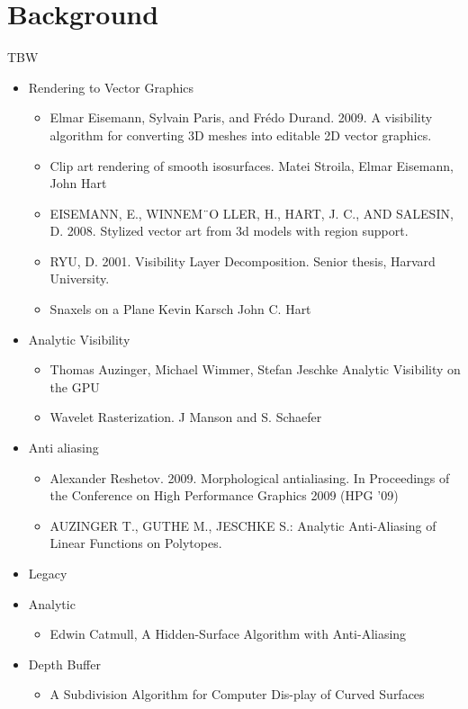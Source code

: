 \documentclass[review]{acmsiggraph}
\begin{document}
\section{Background}
TBW
\begin{itemize}
\item Rendering to Vector Graphics 
\begin{itemize}
\item Elmar Eisemann, Sylvain Paris, and Frédo Durand. 2009. A visibility algorithm for converting 3D meshes into editable 2D vector graphics. 
\item Clip art rendering of smooth isosurfaces. Matei Stroila, Elmar Eisemann, John Hart
\item EISEMANN, E., WINNEM¨O LLER, H., HART, J. C., AND SALESIN, D. 2008. Stylized vector art from 3d models with region support.
\item RYU, D. 2001. Visibility Layer Decomposition. Senior thesis, Harvard University.
\item Snaxels on a Plane Kevin Karsch John C. Hart 
\end{itemize}
\item Analytic Visibility
\begin{itemize}
\item Thomas Auzinger, Michael Wimmer, Stefan Jeschke Analytic Visibility on the GPU
\item Wavelet Rasterization. J  Manson and S. Schaefer
\end{itemize}
\item Anti aliasing
\begin{itemize}
\item Alexander Reshetov. 2009. Morphological antialiasing. In Proceedings of the Conference on High Performance Graphics 2009 (HPG '09)
\item AUZINGER T., GUTHE M., JESCHKE S.: Analytic Anti-Aliasing of Linear Functions on Polytopes.
\end{itemize}
\item Legacy 
\item Analytic
\begin{itemize}
\item Edwin Catmull, A Hidden-Surface Algorithm with Anti-Aliasing
\end{itemize}
\item Depth Buffer
\begin{itemize}
\item A Subdivision Algorithm for Computer Dis-play of Curved Surfaces
\end{itemize}

\end{itemize}
\end{document}
